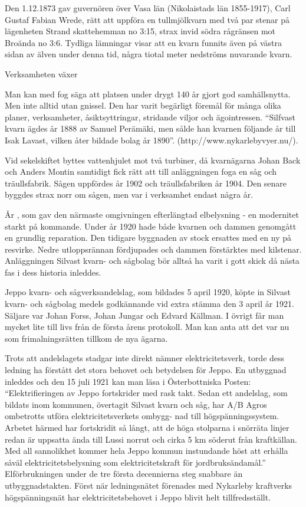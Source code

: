 Den 1.12.1873 gav guvernören över Vasa län (Nikolaistads län 1855-1917), Carl Gustaf Fabian Wrede, rätt att uppföra en tullmjölkvarn med två par stenar på lägenheten Strand skattehemman no 3:15, strax invid södra rågränsen mot Broända no 3:6. Tydliga lämningar visar att en kvarn funnits även på västra sidan av älven under denna tid, några tiotal meter nedströms nuvarande kvarn.


Verksamheten växer

Man kan med fog säga att platsen under drygt 140 år gjort god samhällsnytta. Men inte alltid utan gnissel. Den har varit begärligt föremål för många olika planer, verksamheter, åsiktsyttringar, stridande viljor och ägointressen. ``Silfvast kvarn ägdes år 1888 av Samuel Perämäki, men sålde han kvarnen följande år till Isak Lavast, vilken åter bildade bolag år 1890''. (http://www.nykarlebyvyer.nu/).

Vid sekelskiftet byttes vattenhjulet mot två turbiner, då kvarnägarna Johan Back och Anders Montin samtidigt fick rätt att till anläggningen foga en såg och träullsfabrik. Sågen uppfördes år 1902 och träullsfabriken år 1904. Den senare byggdes strax norr om sågen, men var i verksamhet endast några år.

År , som gav den närmaste omgivningen efterlängtad elbelysning - en modernitet starkt på kommande. Under år 1920 hade både kvarnen och dammen genomgått en grundlig reparation. Den tidigare byggnaden av stock ersattes med en ny på resvirke. Nedre utloppsrännan fördjupades och dammen förstärktes med kilstenar. Anläggningen Silvast kvarn- och sågbolag bör alltså ha varit i gott skick då nästa fas i dess historia inleddes.

Jeppo kvarn- och sågverksandelslag, som bildades 5 april 1920,  köpte in Silvast kvarn- och sågbolag medels godkännande vid extra stämma den 3 april år 1921. Säljare var Johan Forss, Johan Jungar och Edvard Källman. I övrigt får man mycket lite till livs från de första årens protokoll. Man kan anta att det var nu som frimalningsrätten tillkom de nya ägarna.

Trots att andelslagets stadgar inte direkt nämner elektricitetsverk, torde dess ledning ha förstått det stora behovet och betydelsen för Jeppo. En utbyggnad inleddes och den 15 juli 1921 kan man läsa i Österbottniska Posten: ``Elektrifieringen av Jeppo fortskrider med rask takt. Sedan ett andelslag, som bildats inom kommunen, övertagit Silvast kvarn och såg, har A/B Agros ombetrotts utföra elektricitetsverkets ombygg- nad till högspänningssystem. Arbetet härmed har fortskridit så långt, att de höga stolparna i snörräta linjer redan är uppsatta ända till Lussi norrut och cirka 5 km söderut från kraftkällan. Med all sannolikhet kommer hela Jeppo kommun instundande höst att erhålla såväl elektricitetsbelysning som elektricitetskraft för jordbruksändamål.''  Elförbrukningen under de tre första decennierna steg snabbare än utbyggnadstakten. Först när ledningsnätet förenades med Nykarleby kraftverks högspänningsnät har elektricitetsbehovet i Jeppo blivit helt tillfredsställt.

